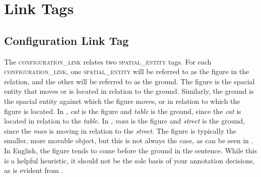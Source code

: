 \documentclass[11pt]{article}
\begin{document}





\section{Link Tags} %
\label{sec:link_tags}

\subsection{Configuration Link Tag} %
\label{sub:configuration_link}
The \textsc{configuration\_link} relates two \textsc{spatial\_entity} tags. For each \textsc{configuration\_link}, one \textsc{spatial\_entity} will be referred to as the figure in the relation, and the other will be referred to as the ground. The figure is the spacial entity that moves or is located in relation to the ground. Similarly, the ground is the spacial entity against which the figure moves, or in relation to which the figure is located. In , \emph{cat} is the figure and \emph{table} is the ground, since the \emph{cat} is located in relation to the \emph{table}. In , \emph{man} is the figure and \emph{street} is the ground, since the \emph{man} is moving in relation to the \emph{street}. The figure is typically the smaller, more movable object, but this is not always the case, as can be seen in . In English, the figure tends to come before the ground in the sentence. While this is a helpful heuristic, it should not be the sole basis of your annotation decisions, as is evident from .
 
\end{document}
